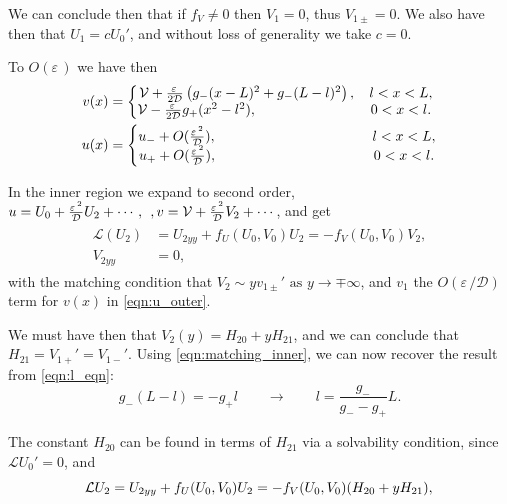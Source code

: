 \documentclass[a4paper,10pt]{article}
\newcommand{\Ep}{\ensuremath{\varepsilon\,}}
\newcommand{\DD}{\ensuremath{\mathcal{D}}}
\newcommand{\VV}{\ensuremath{\mathcal{V}}}
\newcommand{\LL}{\ensuremath{\mathcal{L}}}
\begin{document}
We can conclude then that if $f_V\neq0$ then $V_1=0$, thus $V_{1\pm}=0$. We also have then that $U_1 = cU_0'$, and without loss of generality we take $c=0$.

To $O(\Ep)$ we have then
% 
\begin{equation}
\label{eqn:u_outer}
	\begin{split}
	v(x) &= \left\{
	\begin{matrix}
	  \VV + \frac{\Ep}{2\DD}\left(g_-(x-L)^2 + g_-(L-l)^2 \right),&l<x<L,\\
	  \VV - \frac{\Ep}{2\DD}g_+(x^2-l^2),\hspace{1in}&0<x<l.
	\end{matrix}\right.\\
	u(x) &= \left\{
	\begin{matrix}
	  u_- + O(\frac{\Ep^2}{\DD}),\hspace{1.43in}&l<x<L,\\
	  u_+ + O(\frac{\Ep^2}{\DD}),\hspace{1.42in} &0<x<l.
	\end{matrix}\right.\\
	\end{split}
\end{equation}
% 

In the inner region we expand to second order, $u=U_0 + \frac{\Ep^2}{\DD}U_2+\cdots,\hspace{1ex}, v = \VV + \frac{\Ep^2}{\DD}V_2+\cdots$, and get
% 
\begin{equation*}
\begin{split}
\begin{aligned}
	\LL(U_2) &= U_{2yy}+f_U(U_0,V_0)U_2=-f_V(U_0,V_0)V_2,\\
	V_{2yy} &= 0,
\end{aligned}
\end{split}
\end{equation*}
%
with the matching condition that $V_2\sim yv_{1\pm}'\text{ as }y\rightarrow\mp\infty$, and $v_1$ the $O(\Ep/\DD)$ term for $v(x)$ in \eqref{eqn:u_outer}.

We must have then that $V_2(y) = H_{20} + yH_{21}$, and we can conclude that $H_{21} = V_{1+}' = V_{1-}'$. Using \eqref{eqn:matching_inner}, we can now recover the result from \eqref{eqn:l_eqn}:
% 
\begin{equation*}
	g_-(L-l) = -g_+l\qquad \rightarrow \qquad l=\frac{g_-}{g_- - g_+}L.
\end{equation*}
% 

The constant $H_{20}$ can be found in terms of $H_{21}$ via a solvability condition, since $\LL U_0' = 0$, and 
% 
\begin{equation*}
	\LL U_2 = U_{2yy} + f_U(U_0,V_0)U_2 = -f_V(U_0,V_0)(H_{20}+yH_{21}),\\
\end{equation*}
% 
\end{document}
